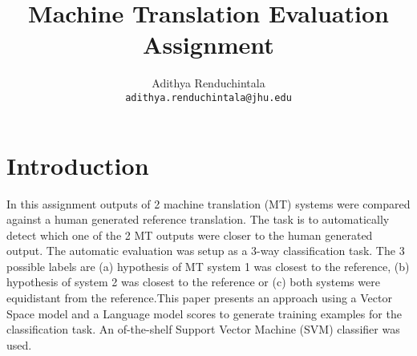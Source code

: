 \documentclass[11pt]{article}
\title{Machine Translation Evaluation Assignment}
\author{Adithya Renduchintala \\
  {\tt adithya.renduchintala@jhu.edu}\\
  }
\date{}
\begin{document}
\maketitle


\section{Introduction}
In this assignment  outputs of 2 machine translation (MT)
systems were compared against a human generated reference translation. The task
is to automatically detect which one of the 2 MT outputs were closer to the
human generated output. The automatic evaluation was setup as a 3-way
classification task. The 3 possible labels are (a) hypothesis of MT system 1
was closest to the reference, (b) hypothesis of system 2 was closest to the
reference or (c) both systems were equidistant from the reference.This paper
presents an approach using a Vector Space model and a Language model scores to 
generate training examples for the classification task. An of-the-shelf Support 
Vector Machine (SVM) classifier was used.
\end{document}
